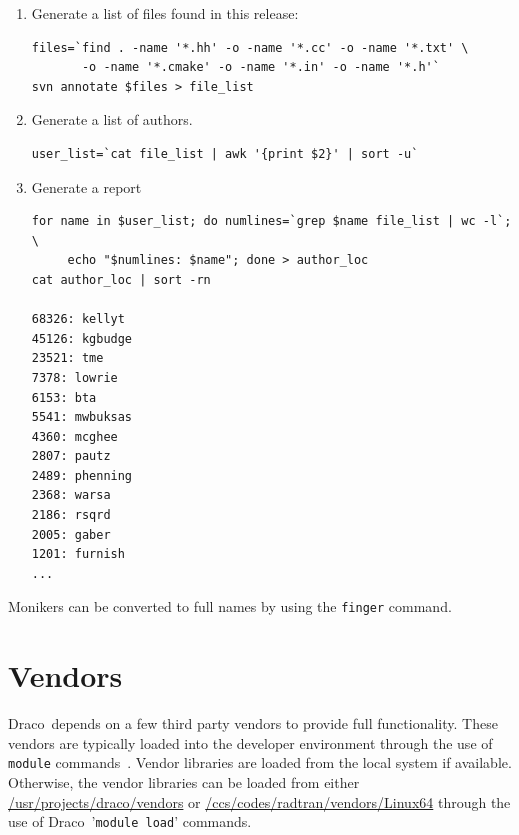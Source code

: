 \documentclass[note]{ResearchNote_pdf}
\newcommand{\draco}{{\normalfont\small\sffamily Draco}}
\begin{document}
\begin{enumerate}
\item Generate a list of files found in this release:
\begin{lstlisting}[basicstyle=\footnotesize, xleftmargin=0.75in, 
  xrightmargin=0.75in]
files=`find . -name '*.hh' -o -name '*.cc' -o -name '*.txt' \
       -o -name '*.cmake' -o -name '*.in' -o -name '*.h'`
svn annotate $files > file_list
\end{lstlisting}
\item Generate a list of authors.
\begin{lstlisting}[basicstyle=\footnotesize, xleftmargin=0.75in, 
  xrightmargin=0.75in]
user_list=`cat file_list | awk '{print $2}' | sort -u`
\end{lstlisting}
\item Generate a report
\begin{lstlisting}[basicstyle=\footnotesize, xleftmargin=0.75in, 
  xrightmargin=0.75in]
for name in $user_list; do numlines=`grep $name file_list | wc -l`; \
     echo "$numlines: $name"; done > author_loc
cat author_loc | sort -rn

68326: kellyt
45126: kgbudge
23521: tme
7378: lowrie
6153: bta
5541: mwbuksas
4360: mcghee
2807: pautz
2489: phenning
2368: warsa
2186: rsqrd
2005: gaber
1201: furnish
...
\end{lstlisting}
\end{enumerate}

Monikers can be converted to full names by using the \texttt{finger}
command. 


\section{Vendors}
\label{sec:vendors}

\draco\ depends on a few third party vendors to provide full
functionality.  These vendors are typically loaded into the developer
environment through the use of \texttt{module}
commands~\cite{modulecmd}.  Vendor libraries are loaded from the local
system if available.  Otherwise, the vendor libraries can be loaded
from either \url{/usr/projects/draco/vendors} or
\url{/ccs/codes/radtran/vendors/Linux64} through the use of
\draco\ '\texttt{module load}' commands.
\end{document}
